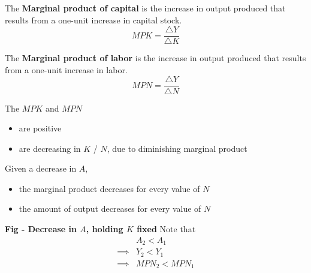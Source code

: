 \documentclass[letterpaper, 9pt,landscape]{extarticle}
\begin{document}
\begin{multicols*}{5}
\begin{definition}
    The \textbf{Marginal product of capital} is the increase in output produced that results from a one-unit increase in capital stock. 
    \[
        MPK = \frac{\triangle Y}{\triangle K}
    \]
\end{definition}

\begin{definition}
    The \textbf{Marginal product of labor} is the increase in output produced that results from a one-unit increase in labor. 
    \[
        MPN = \frac{\triangle Y}{\triangle N}
    \]
\end{definition}

\begin{remark}
    The $MPK$ and $MPN$
    \begin{itemize}
        \item are positive 
        \item are decreasing in $K$ / $N$, due to diminishing marginal product
    \end{itemize} 
\end{remark}

\begin{remark}
Given a decrease in $A$, 
    \begin{itemize}
        \item the marginal product decreases for every value of $N$
        \item the amount of output decreases for every value of $N$
    \end{itemize} 
    \centering
    \textbf{Fig - Decrease in $A$, holding $K$ fixed}
    Note that 
    \begin{align*}
        &A_2 < A_1 \\
        \implies&  Y_2 < Y_1 \\
        \implies&  MPN_2 <  MPN_1
    \end{align*}
\end{remark}


\end{multicols*}
\end{document}
